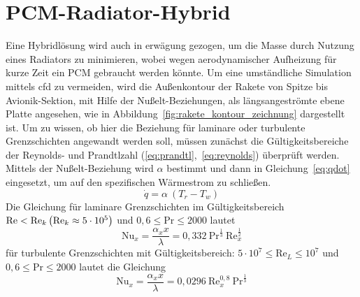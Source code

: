 \section{PCM-Radiator-Hybrid}\label{sec:pcmRadiatorHybrid}
Eine Hybridlösung wird auch in erwägung gezogen, um die Masse durch Nutzung eines Radiators zu minimieren, wobei wegen aerodynamischer Aufheizung für kurze Zeit ein PCM gebraucht werden könnte.
Um eine umständliche Simulation mittels \ac{cfd} zu vermeiden, wird die Außenkontour der Rakete von Spitze bis Avionik-Sektion, mit Hilfe der Nußelt-Beziehungen, als längsangeströmte ebene Platte angesehen,
wie in Abbildung~\ref{fig:rakete_kontour_zeichnung} dargestellt ist.
Um zu wissen, ob hier die Beziehung für laminare oder turbulente Grenzschichten angewandt werden soll, müssen zunächst die Gültigkeitsbereiche der Reynolds- und Prandtlzahl (\ref{eq:prandtl},~\ref{eq:reynolds}) überprüft werden.
Mittels der Nußelt-Beziehung wird $\alpha$ bestimmt und dann in Gleichung~\ref{eq:qdot} eingesetzt, um auf den spezifischen Wärmestrom zu schließen.
\begin{equation}
  \label{eq:qdot}
  \dot{q} = \alpha \ (T_r - T_w)
\end{equation}
Die Gleichung für laminare Grenzschichten im Gültigkeitsbereich $\text{Re} < \text{Re}_k\\\left(\text{Re}_k \approx 5 \cdot 10^5\right)$ und $0,6 \leq \text{Pr} \leq 2000$ lautet
\begin{equation}
  \label{eq:nusselt_laminar}
  \text{Nu}_x = \frac{\alpha_x x}{\lambda} = 0,332 \ \text{Pr}^{\frac{1}{3}} \ \text{Re}_x^{\frac{1}{2}}
\end{equation}
für turbulente Grenzschichten mit Gültigkeitsbereich: $5 \cdot 10^7 \leq \text{Re}_L \leq 10^7$ und $ 0,6 \leq \text{Pr} \leq 2000$ lautet die Gleichung
\begin{equation}
  \label{eq:nusselt_turbulent}
  \text{Nu}_x = \frac{\alpha_x x}{\lambda} = 0,0296 \ \text{Re}_x^{0,8} \ \text{Pr}^{\frac{1}{3}}
\end{equation}


